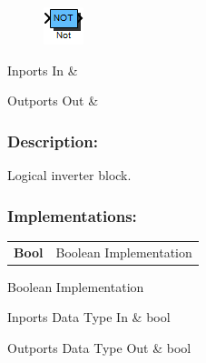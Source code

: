 \label{block:Not}
\begin{figure}[H]\includegraphics{Not}\end{figure} 

\begin{XtoCtabular}{Inports}
In & \tabularnewline
\hline
\end{XtoCtabular}


\begin{XtoCtabular}{Outports}
Out & \tabularnewline
\hline
\end{XtoCtabular}

\subsubsection*{Description:}
Logical inverter block.

\subsubsection*{Implementations:}
\begin{tabular}{l l}
\textbf{Bool} & Boolean Implementation\tabularnewline
\end{tabular}

\nopagebreak[0]

Boolean Implementation

\begin{XtoCtabular}{Inports Data Type}
In & bool\tabularnewline
\hline
\end{XtoCtabular}

\begin{XtoCtabular}{Outports Data Type}
Out & bool\tabularnewline
\hline
\end{XtoCtabular}

\ifdefined \AddTestReports
{}
\fi
